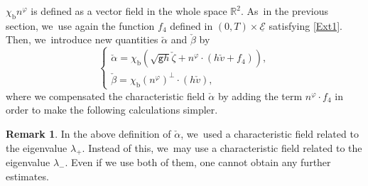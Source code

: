\documentclass[JEP,XML,SOM,Unicode,NoFloatCountersInSection,published]{cedram}
\newcommand{\gr}{{\mathtt g}}
\newcommand{\R}{{\mathbb R}}
\newcommand{\cE}{{\mathcal E}}
\newcommand{\ul}[1]{\underline{#1}}
\theoremstyle{definition}
\newtheorem{remark}[theorem]{Remark}
\begin{document}
$\chi_\mathrm{b}n^\varphi$ is defined as a vector field in the whole space $\R^2$. As~in the previous section, we~use again the function $f_4$ defined in $(0,T)\times\ul{\cE}$ satisfying \eqref{Ext1}.
Then, we~introduce new quantities $\check{\alpha}$ and $\check{\beta}$ by
\begin{equation}\label{defCF}
\begin{cases}
\check{\alpha}=\chi_\mathrm{b}(\sqrt{\gr h}\check{\zeta} + n^\varphi\cdot(h\check{v}+f_4)), \\
\check{\beta}=\chi_\mathrm{b}(n^\varphi)^\perp\cdot(h\check{v}),
\end{cases}
\end{equation}
where we compensated the characteristic field $\check{\alpha}$ by adding the term $n^\varphi\cdot f_4$ in order to make the following calculations simpler.

\begin{remark}
In the above definition of $\check{\alpha}$, we~used a characteristic field related to the eigenvalue $\lambda_+$.
Instead of this, we~may use a characteristic field related to the eigenvalue $\lambda_-$.
Even if we use both of them, one cannot obtain any further estimates.
\end{remark}
\end{document}
